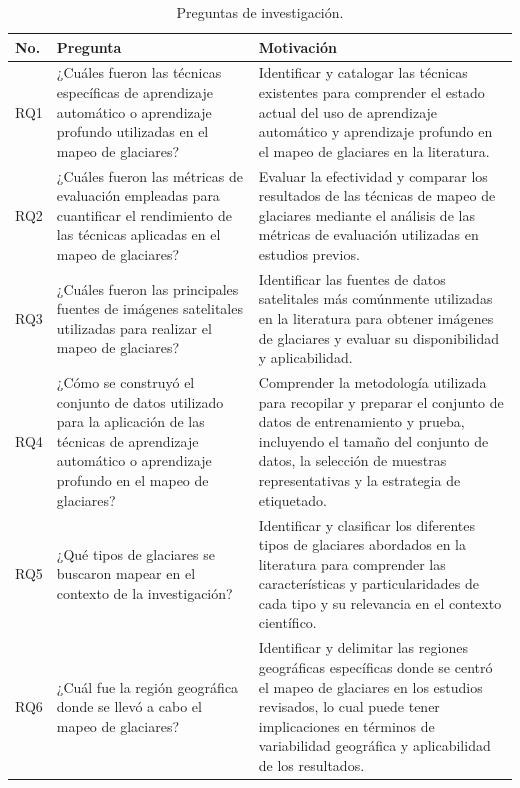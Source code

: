 \begin{table}[H]
\small
\caption{Preguntas de investigación.}
\begin{tabularx}{\textwidth}{lXX}
\hline
\textbf{No.} & \textbf{Pregunta} & \textbf{Motivación}\\
\hline
RQ1	& ¿Cuáles fueron las técnicas específicas de aprendizaje automático o aprendizaje profundo utilizadas en el mapeo de glaciares?	& Identificar y catalogar las técnicas existentes para comprender el estado actual del uso de aprendizaje automático y aprendizaje profundo en el mapeo de glaciares en la literatura. \\\hline
RQ2	& ¿Cuáles fueron las métricas de evaluación empleadas para cuantificar el rendimiento de las técnicas aplicadas en el mapeo de glaciares?	& Evaluar la efectividad y comparar los resultados de las técnicas de mapeo de glaciares mediante el análisis de las métricas de evaluación utilizadas en estudios previos. \\\hline
RQ3	& ¿Cuáles fueron las principales fuentes de imágenes satelitales utilizadas para realizar el mapeo de glaciares?	& Identificar las fuentes de datos satelitales más comúnmente utilizadas en la literatura para obtener imágenes de glaciares y evaluar su disponibilidad y aplicabilidad. \\\hline
RQ4	& ¿Cómo se construyó el conjunto de datos utilizado para la aplicación de las técnicas de aprendizaje automático o aprendizaje profundo en el mapeo de glaciares?	& Comprender la metodología utilizada para recopilar y preparar el conjunto de datos de entrenamiento y prueba, incluyendo el tamaño del conjunto de datos, la selección de muestras representativas y la estrategia de etiquetado. \\\hline
RQ5	& ¿Qué tipos de glaciares se buscaron mapear en el contexto de la investigación? & Identificar y clasificar los diferentes tipos de glaciares abordados en la literatura para comprender las características y particularidades de cada tipo y su relevancia en el contexto científico. \\\hline
RQ6	& ¿Cuál fue la región geográfica donde se llevó a cabo el mapeo de glaciares? & Identificar y delimitar las regiones geográficas específicas donde se centró el mapeo de glaciares en los estudios revisados, lo cual puede tener implicaciones en términos de variabilidad geográfica y aplicabilidad de los resultados. \\
\hline
\end{tabularx}
\label{tab:PreguntasInvestigacion}
\end{table}


